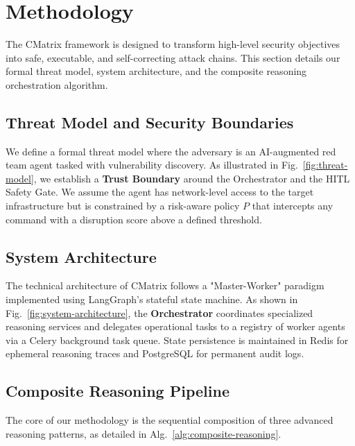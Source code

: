 \section{Methodology}

The CMatrix framework is designed to transform high-level security objectives into safe, executable, and self-correcting attack chains. This section details our formal threat model, system architecture, and the composite reasoning orchestration algorithm.

\subsection{Threat Model and Security Boundaries}
We define a formal threat model where the adversary is an AI-augmented red team agent tasked with vulnerability discovery. As illustrated in Fig.~\ref{fig:threat-model}, we establish a \textbf{Trust Boundary} around the Orchestrator and the HITL Safety Gate. We assume the agent has network-level access to the target infrastructure but is constrained by a risk-aware policy $P$ that intercepts any command with a disruption score above a defined threshold.



\subsection{System Architecture}
The technical architecture of CMatrix follows a "Master-Worker" paradigm implemented using LangGraph's stateful state machine. As shown in Fig.~\ref{fig:system-architecture}, the \textbf{Orchestrator} coordinates specialized reasoning services and delegates operational tasks to a registry of worker agents via a Celery background task queue. State persistence is maintained in Redis for ephemeral reasoning traces and PostgreSQL for permanent audit logs.



\subsection{Composite Reasoning Pipeline}
The core of our methodology is the sequential composition of three advanced reasoning patterns, as detailed in Alg.~\ref{alg:composite-reasoning}. 



